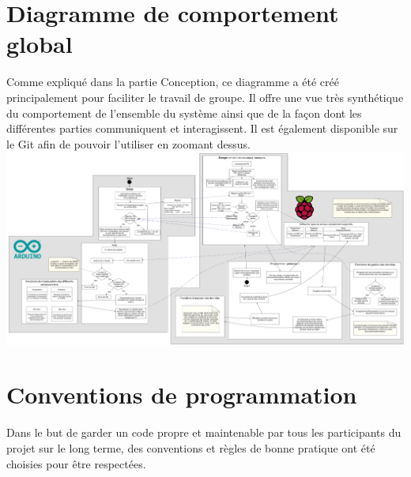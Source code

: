 \documentclass[11pt,a4paper,11pt]{report}
\begin{document}
%


\chapter{Diagramme de comportement global}
\label{dia_complet}
Comme expliqué dans la partie Conception, ce diagramme a été créé principalement pour faciliter le travail de groupe. Il offre une vue très synthétique du comportement de l'ensemble du système ainsi que de la façon dont les différentes parties communiquent et interagissent. Il est également disponible sur le Git afin de pouvoir l'utiliser en zoomant dessus.\\

\includegraphics[width=\textwidth]{images/diagrams_complet.png}





\chapter{Conventions de programmation}


Dans le but de garder un code propre et maintenable par tous les participants du projet sur le long terme, des conventions et règles de bonne pratique ont été choisies pour être respectées.\\
\end{document}

